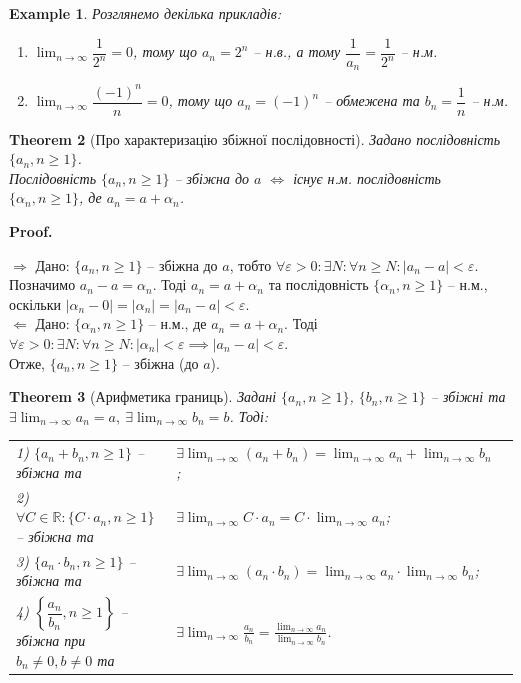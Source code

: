 \documentclass[a4paper, 14pt]{article}
\makeatletter
\def\qed{$\blacksquare$}
\def\rightproof{$\boxed{\Rightarrow}$ }
\def\leftproof{$\boxed{\Leftarrow}$ }
\theoremstyle{theoremdd}
\newtheorem{theorem}{Theorem}[subsection]
\theoremstyle{theoremdd}
\theoremstyle{theoremdd}
\theoremstyle{theoremdd}
\newtheorem{example}[theorem]{Example}
\theoremstyle{theoremdd}
\theoremstyle{theoremdd}
\theoremstyle{theoremdd}
\theoremstyle{theoremdd}
\renewenvironment{proof}[1][Proof.\\]{\par
\pushQED{\hfill \qed}%
\normalfont \topsep6\p@\@plus6\p@\relax
\trivlist
\item\relax
{\bfseries
#1\@addpunct{.}}\hspace\labelsep\ignorespaces
}{%
\popQED\endtrivlist\@endpefalse
}
\makeatother
\begin{document}
	\begin{example}
	Розглянемо декілька прикладів:
	\begin{enumerate}[nosep,wide=0pt,label={\arabic*)}]
	\item $\displaystyle\lim_{n \to \infty} \dfrac{1}{2^n} = 0$, тому що $a_n = 2^n$ -- н.в., а тому $\dfrac{1}{a_n} = \dfrac{1}{2^n}$ -- н.м.\\
	\item $\displaystyle\lim_{n \to \infty} \dfrac{(-1)^n}{n} = 0$, тому що $a_n = (-1)^n$ -- обмежена та $b_n = \dfrac{1}{n}$ -- н.м.
	\end{enumerate}
	\end{example}
	
	\begin{theorem}[Про характеризацію збіжної послідовності]
	Задано послідовність $\{a_n, n \geq 1\}$.\\
	Послідовність $\{a_n, n \geq 1\}$ -- збіжна до $a$ $\iff$ існує н.м. послідовність $\{\alpha_n, n \geq 1\}$, де $a_n = a+\alpha_n$.
	\end{theorem}
	
	\begin{proof}
	\rightproof Дано: $\{a_n, n \geq 1\}$ -- збіжна до $a$, тобто $\forall \varepsilon > 0: \exists N: \forall n \geq N: |a_n-a| < \varepsilon$. Позначимо $a_n-a=\alpha_n$. Тоді $a_n=a+\alpha_n$ та послідовність $\{\alpha_n, n \geq 1\}$ -- н.м., оскільки $|\alpha_n - 0| = |\alpha_n| = |a_n - a| < \varepsilon$.
	\bigskip \\
	\leftproof Дано: $\{\alpha_n, n \geq 1\}$ -- н.м., де $a_n = a + \alpha_n$. Тоді $\forall \varepsilon > 0: \exists N: \forall n \geq N: |\alpha_n| < \varepsilon \implies |a_n - a| < \varepsilon$.\\
	Отже, $\{a_n, n \geq 1\}$ -- збіжна (до $a$).
	\end{proof}
	
	\begin{theorem}[Арифметика границь]
	Задані $\{a_n, n \geq 1\}$, $\{b_n, n \geq 1\}$ -- збіжні та $\exists \displaystyle \lim_{n \to \infty} a_n = a, \ \exists \displaystyle \lim_{n \to \infty} b_n = b$. Тоді:\\
	\begin{tabular}{lll}
	1) $\{a_n+b_n, n \geq 1\}$ -- збіжна та & $\displaystyle \exists \lim_{n \to \infty} (a_n+b_n) = \lim_{n \to \infty} a_n+\lim_{n \to \infty} b_n$;\\
	2) $\forall C \in \mathbb{R}: \{C \cdot a_n, n \geq 1\}$ -- збіжна та & $\displaystyle \exists \lim_{n \to \infty} C \cdot a_n = C \cdot \lim_{n \to \infty} a_n$;\\
	3) $\{a_n \cdot b_n, n \geq 1\}$ -- збіжна та & $\displaystyle \exists \lim_{n \to \infty} (a_n \cdot b_n) = \lim_{n \to \infty} a_n \cdot \lim_{n \to \infty} b_n$;\\
	4) $\left\{\dfrac{a_n}{b_n}, n \geq 1 \right\}$ -- збіжна при $b_n \neq 0, b \neq 0$ та & $\displaystyle \exists \lim_{n \to \infty} \frac{a_n}{b_n} = \frac{\displaystyle \lim_{n \to \infty} a_n}{\displaystyle \lim_{n \to \infty} b_n}$.
	\end{tabular}
	
	\end{theorem}
	
\end{document}

